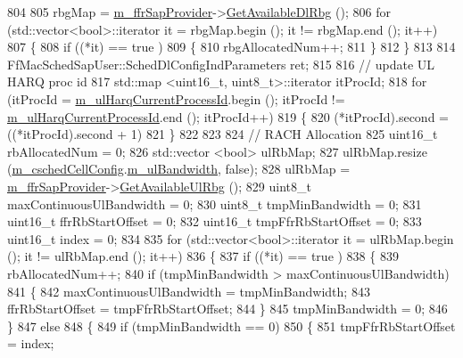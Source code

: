 \begin{DoxyCode}
804 
805   rbgMap = \hyperlink{classns3_1_1CqaFfMacScheduler_a47eeb31f5d284b045d6deba40ac3e108}{m\_ffrSapProvider}->\hyperlink{classns3_1_1LteFfrSapProvider_ad60306dae43b74dc25b65f81d6587a24}{GetAvailableDlRbg} ();
806   \textcolor{keywordflow}{for} (std::vector<bool>::iterator it = rbgMap.begin (); it != rbgMap.end (); it++)
807     \{
808       \textcolor{keywordflow}{if} ((*it) == true )
809         \{
810           rbgAllocatedNum++;
811         \}
812     \}
813 
814   FfMacSchedSapUser::SchedDlConfigIndParameters ret;
815 
816   \textcolor{comment}{//   update UL HARQ proc id}
817   std::map <uint16\_t, uint8\_t>::iterator itProcId;
818   \textcolor{keywordflow}{for} (itProcId = \hyperlink{classns3_1_1CqaFfMacScheduler_a55974c35f8b783bb902ae8676fb6ff10}{m\_ulHarqCurrentProcessId}.begin (); itProcId != 
      \hyperlink{classns3_1_1CqaFfMacScheduler_a55974c35f8b783bb902ae8676fb6ff10}{m\_ulHarqCurrentProcessId}.end (); itProcId++)
819     \{
820       (*itProcId).second = ((*itProcId).second + 1) %
821     \}
822 
823 
824   \textcolor{comment}{// RACH Allocation}
825   uint16\_t rbAllocatedNum = 0;
826   std::vector <bool> ulRbMap;
827   ulRbMap.resize (\hyperlink{classns3_1_1CqaFfMacScheduler_ad5dc768ca3a3c71671fd64de7de8ec00}{m\_cschedCellConfig}.\hyperlink{structns3_1_1FfMacCschedSapProvider_1_1CschedCellConfigReqParameters_a5ab5b102878e6e7e7727a14af4a64d2f}{m\_ulBandwidth}, \textcolor{keyword}{false});
828   ulRbMap = \hyperlink{classns3_1_1CqaFfMacScheduler_a47eeb31f5d284b045d6deba40ac3e108}{m\_ffrSapProvider}->\hyperlink{classns3_1_1LteFfrSapProvider_aafd23b22a27ec83e03d54795c122d175}{GetAvailableUlRbg} ();
829   uint8\_t maxContinuousUlBandwidth = 0;
830   uint8\_t tmpMinBandwidth = 0;
831   uint16\_t ffrRbStartOffset = 0;
832   uint16\_t tmpFfrRbStartOffset = 0;
833   uint16\_t index = 0;
834 
835   \textcolor{keywordflow}{for} (std::vector<bool>::iterator it = ulRbMap.begin (); it != ulRbMap.end (); it++)
836     \{
837       \textcolor{keywordflow}{if} ((*it) == true )
838         \{
839           rbAllocatedNum++;
840           \textcolor{keywordflow}{if} (tmpMinBandwidth > maxContinuousUlBandwidth)
841             \{
842               maxContinuousUlBandwidth = tmpMinBandwidth;
843               ffrRbStartOffset = tmpFfrRbStartOffset;
844             \}
845           tmpMinBandwidth = 0;
846         \}
847       \textcolor{keywordflow}{else}
848         \{
849           \textcolor{keywordflow}{if} (tmpMinBandwidth == 0)
850             \{
851               tmpFfrRbStartOffset = index;

\end{DoxyCode}
